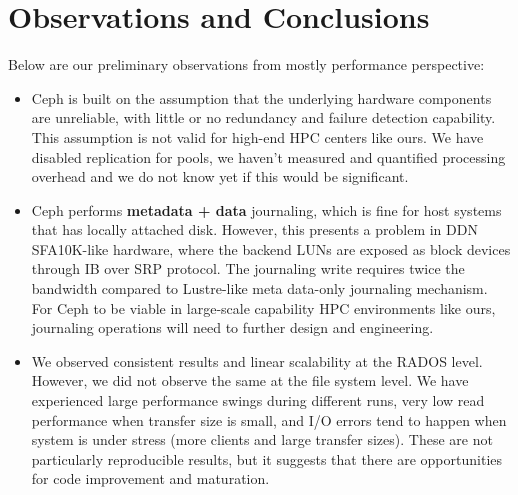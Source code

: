 \section{Observations and Conclusions}
\label{sec:conclusion}

Below are our preliminary observations from mostly performance perspective:

\begin{itemize}

  \item Ceph is built on the assumption that the underlying hardware components
are unreliable, with little or no redundancy and failure detection capability.
This assumption is not valid for high-end HPC centers like ours. We have
disabled replication for pools, we haven't measured and quantified
processing overhead and we do not know yet if this would be significant.

  \item Ceph performs \textbf{metadata + data} journaling, which is fine for
host systems that has locally attached disk. However, this presents a problem
in DDN SFA10K-like hardware, where the backend LUNs are exposed as block
devices through IB over SRP protocol. The journaling write requires twice the
bandwidth compared to Lustre-like meta data-only journaling mechanism. For Ceph
to be viable in large-scale capability HPC environments like ours, journaling
operations will need to further design and engineering.

  \item We observed consistent results and linear scalability at the RADOS
level. However, we did not observe the same at the file system level. We have
experienced large performance swings during different runs, very low read
performance when transfer size is small, and I/O errors tend to happen when
system is under stress (more clients and large transfer sizes). These are not
particularly reproducible results, but it suggests that there are opportunities
for code improvement and maturation.

\end{itemize}

